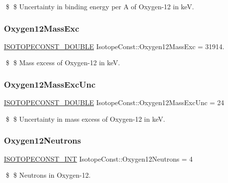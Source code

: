 \$ \$ Uncertainty in binding energy per A of Oxygen-\/12 in keV. \mbox{\label{group___isotope_const-_oxygen-_o12_ga09b6626e9fa760726753d71b9df799db}} 
\subsubsection{\texorpdfstring{Oxygen12\+Mass\+Exc}{Oxygen12MassExc}}
{\footnotesize\ttfamily \mbox{\hyperlink{group___isotope_const-_macros_ga8f45a7272ce02c0b4c65c44636ed719a}{I\+S\+O\+T\+O\+P\+E\+C\+O\+N\+S\+T\+\_\+\+D\+O\+U\+B\+LE}} Isotope\+Const\+::\+Oxygen12\+Mass\+Exc = 31914.}

\$ \$ Mass excess of Oxygen-\/12 in keV. \mbox{\label{group___isotope_const-_oxygen-_o12_ga355757d4b6be6fbf41528f692686bd35}} 
\subsubsection{\texorpdfstring{Oxygen12\+Mass\+Exc\+Unc}{Oxygen12MassExcUnc}}
{\footnotesize\ttfamily \mbox{\hyperlink{group___isotope_const-_macros_ga8f45a7272ce02c0b4c65c44636ed719a}{I\+S\+O\+T\+O\+P\+E\+C\+O\+N\+S\+T\+\_\+\+D\+O\+U\+B\+LE}} Isotope\+Const\+::\+Oxygen12\+Mass\+Exc\+Unc = 24}

\$ \$ Uncertainty in mass excess of Oxygen-\/12 in keV. \mbox{\label{group___isotope_const-_oxygen-_o12_ga37957bd5470cf6b683cfb73df626dc27}} 
\subsubsection{\texorpdfstring{Oxygen12\+Neutrons}{Oxygen12Neutrons}}
{\footnotesize\ttfamily \mbox{\hyperlink{group___isotope_const-_macros_ga5f18360b3e99483a35c32d789e62621c}{I\+S\+O\+T\+O\+P\+E\+C\+O\+N\+S\+T\+\_\+\+I\+NT}} Isotope\+Const\+::\+Oxygen12\+Neutrons = 4}

\$ \$ Neutrons in Oxygen-\/12. \mbox{\label{group___isotope_const-_oxygen-_o12_ga751a4c2730caf6e693045026dff13d8a}} 
